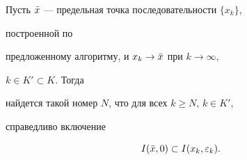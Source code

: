 \begin{lem}


Пусть $\Bar x$ --- предельная точка последовательности $\{x_k\}$,


построенной по


предложенному алгоритму, и $x_k\to\Bar x$ при $k\to\infty$,


$k\in K'\subset K$. Тогда


найдется такой номер $N$, что для всех $k\ge N$, $k\in K'$,


справедливо включение


\begin{equation}


I(\Bar x,0)\subset I(x_k,\varepsilon_k).


\end{equation}


\end{lem}





